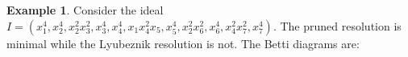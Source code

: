 \documentclass[12pt]{amsart}
\theoremstyle{definition}
\newtheorem{example}[theorem]{Example}
\theoremstyle{remark}
\numberwithin{equation}{section}
\newcommand{\phil}[1]{{\color{red} \sf $\star\star$ Philippe: [#1]}}
\begin{document}
\begin{example}
Consider the ideal %
$
I=({x}_{1}^{4}, {x}_{2}^{4}, {x}_{2}^{2} {x}_{3}^{2}, {x}_{3}^{4}, {x}_{4}^{4}, {x}_{1} {x}_{4}^{2} {x}_{5},
{x}_{5}^{4}, {x}_{2}^{2} {x}_{6}^{2}, {x}_{6}^{4}, {x}_{4}^{2} {x}_{7}^{2}, {x}_{7}^{4}).
$
%
%
The pruned resolution is minimal while the Lyubeznik resolution is not. The Betti diagrams are:

\vskip 2mm


\end{example}
\end{document}
